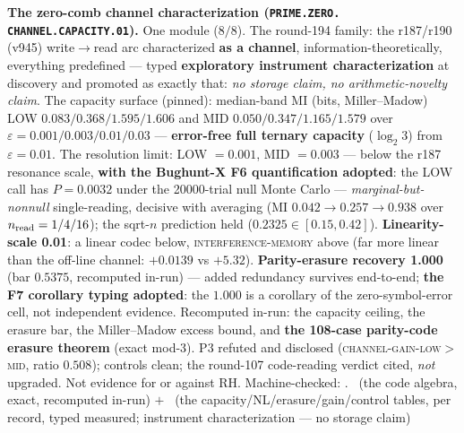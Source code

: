 \documentclass[11pt,a4paper]{article}
\theoremstyle{definition}
\begin{document}
\par\smallskip\noindent\textbf{The zero-comb channel
characterization (\texttt{PRIME.\allowbreak ZERO.\allowbreak
CHANNEL.\allowbreak CAPACITY.01}).}
One module ($8/8$).  The round-194 family: the r187/r190 (v945)
write$\to$read arc characterized \textbf{as a channel},
information-theoretically, everything predefined --- typed
\textbf{exploratory instrument characterization} at discovery and
promoted as exactly that: \emph{no storage claim, no
arithmetic-novelty claim}.  The capacity surface (pinned):
median-band MI (bits, Miller--Madow) LOW
$0.083/0.368/1.595/1.606$ and MID $0.050/0.347/1.165/1.579$ over
$\varepsilon = 0.001/0.003/0.01/0.03$ --- \textbf{error-free full
ternary capacity} ($\log_2 3$) from $\varepsilon = 0.01$.  The
resolution limit: LOW $= 0.001$, MID $= 0.003$ --- below the r187
resonance scale, \textbf{with the Bughunt-X F6 quantification
adopted}: the LOW call has $P = 0.0032$ under the 20000-trial
null Monte Carlo --- \emph{marginal-but-nonnull} single-reading,
decisive with averaging (MI $0.042 \to 0.257 \to 0.938$ over
$n_{\rm read} = 1/4/16$); the sqrt-$n$ prediction held ($0.2325
\in [0.15, 0.42]$).  \textbf{Linearity-scale 0.01}: a linear
codec below, \textsc{interference-memory} above (far more linear
than the off-line channel: $+0.0139$ vs $+5.32$).
\textbf{Parity-erasure recovery 1.000} (bar $0.5375$, recomputed
in-run) --- added redundancy survives end-to-end; \textbf{the F7
corollary typing adopted}: the $1.000$ is a corollary of the
zero-symbol-error cell, not independent evidence.  Recomputed
in-run: the capacity ceiling, the erasure bar, the Miller--Madow
excess bound, and \textbf{the 108-case parity-code erasure
theorem} (exact mod-3).  P3 refuted and disclosed
(\textsc{channel-gain-low$>$mid}, ratio $0.508$); controls clean;
the round-107 code-reading verdict cited, \emph{not} upgraded.
Not evidence for or against RH.
Machine-checked: .
\mE\ (the code algebra, exact, recomputed in-run) $+$ \mC\ (the
capacity/NL/erasure/gain/control tables, per record, typed
measured; instrument characterization --- no storage claim)
\par\smallskip
\end{document}
